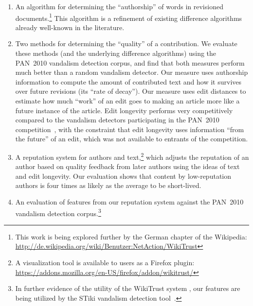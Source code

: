 \begin{enumerate}

\item An algorithm for determining the ``authorship'' of words in
  revisioned documents.\footnote{This work is being explored further
  by the German chapter of the Wikipedia: \\
  \url{http://de.wikipedia.org/wiki/Benutzer:NetAction/WikiTrust}}
  This algorithm is a refinement of existing difference algorithms
  already well-known in the literature.

\item Two methods for determining the ``quality'' of a contribution.
  We evaluate these methods (and the underlying difference algorithms)
  using the PAN~2010 vandalism detection corpus, and find that both
  measures perform much better than a random vandalism detector.
  Our  measure uses authorship information to
  compute the amount of contributed text and how it survives over
  future revisions (its ``rate of decay'').
  Our  measure uses edit distances to estimate
  how much ``work'' of an edit goes to making an article more like a
  future instance of the article.
  Edit longevity performs very competitively
  compared to the vandalism detectors participating in the
  PAN~2010 competition~\cite{Potthast2010b}, with the constraint that
  edit longevity uses information ``from the future'' of an edit,
  which was not available to entrants of the competition.

\item A reputation system for authors and text,\footnote{A visualization
  tool is available to users as a Firefox plugin: \\
  \url{https://addons.mozilla.org/en-US/firefox/addon/wikitrust/}}
  which adjusts the reputation of an author based on quality feedback
  from later authors using the ideas of text and edit longevity.
  Our evaluation shows that content by low-reputation authors is
  four times as likely as the average to be short-lived.

\item An evaluation of features from our reputation system
  against the PAN~2010 vandalism detection
  corpus.\footnote{In further evidence of the utility of the WikiTrust
  system , our features are being utilized by the STiki vandalism
  detection tool~\cite{wiki:STiki}.}

\end{enumerate}

